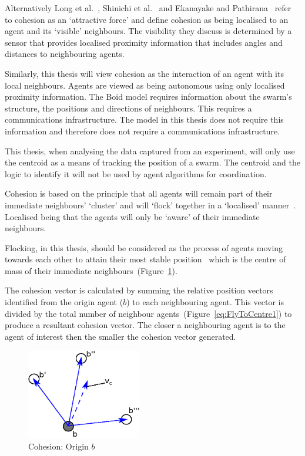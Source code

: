 Alternatively Long et al.~\cite{QZYP:13}, Shinichi et al.~\cite{AYSH:08} and Ekanayake and Pathirana~\cite{EP:10} refer to cohesion as an `attractive force' and define cohesion as being localised to an agent and its `visible' neighbours. The visibility they discuss is determined by a sensor that provides localised proximity information that includes angles and distances to neighbouring agents.
 
Similarly, this thesis will view cohesion as the interaction of an agent with its local neighbours. Agents are viewed as being autonomous using only localised proximity information. The Boid model requires information about the swarm's structure, the positions and directions of neighbours. This requires a communications infrastructure. The model in this thesis does not require this information and therefore does not require a communications infrastructure.

This thesis, when analysing the data captured from an experiment, will only use the centroid as a means of tracking the position of a swarm. The centroid and the logic to identify it will not be used by agent algorithms for coordination. 

Cohesion is based on the principle that all agents will remain part of their immediate neighbours' `cluster' and will `flock' together in a `localised' manner~\cite{VGHHDM:15, BAF:06, BAFVM:06, BFV:07, BM:09, HAY:08, HCS:09}. Localised being that the agents will only be `aware' of their immediate neighbours. 

Flocking, in this thesis, should be considered as the process of agents moving towards each other to attain their most stable position~\cite{GMJ:11, IGMFM:08} which is the centre of mass of their immediate neighbours~(Figure~\ref{methods:FlyToCentre1}). 

The cohesion vector is calculated by summing the relative position vectors identified from the origin agent ($b$) to each neighbouring agent. This vector is divided by the total number of neighbour agents~(Figure~\ref{eq:FlyToCentre1}) to produce a resultant cohesion vector. The closer a neighbouring agent is to the agent of interest then the smaller the cohesion vector generated.

\begin{figure}[H]
\begin{center}
\includegraphics[width=5cm]{CHAPTER-2/figures/FlyToCentre1}
\end{center}
\caption{Cohesion: Origin $b$ \label{methods:FlyToCentre1}}
\end{figure}

